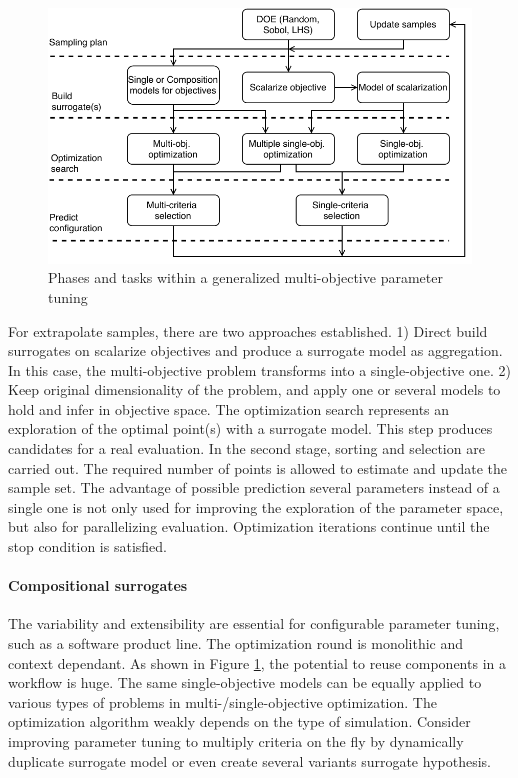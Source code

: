             \begin{figure} 
                \centering
                \includegraphics[width=\textwidth]{content/images/tax_mb_tuning}
                \caption[Phases and tasks within a generalized multi-objective parameter tuning]{Phases and tasks within a generalized multi-objective parameter tuning}
                \label{fig:mo_param_tuning}
            \end{figure}

            For extrapolate samples, there are two approaches established. 1) Direct build surrogates on scalarize objectives and produce a surrogate model as aggregation. In this case, the multi-objective problem transforms into a single-objective one. 2) Keep original dimensionality of the problem, and apply one or several models to hold and infer in objective space.
            The optimization search represents an exploration of the optimal point(s) with a surrogate model. This step produces candidates for a real evaluation. In the second stage, sorting and selection are carried out. The required number of points is allowed to estimate and update the sample set. The advantage of possible prediction several parameters instead of a single one is not only used for improving the exploration of the parameter space, but also for parallelizing evaluation.  Optimization iterations continue until the stop condition is satisfied.
    
    
            \paragraph{Compositional surrogates}
            The variability and extensibility are essential for configurable parameter tuning, such as a software product line. The optimization round is monolithic and context dependant. As shown in Figure \ref{fig:mo_param_tuning}, the potential to reuse components in a workflow is huge. The same single-objective models can be equally applied to various types of problems in multi-/single-objective optimization. The optimization algorithm weakly depends on the type of simulation. 
            Consider improving parameter tuning to multiply criteria on the fly by dynamically duplicate surrogate model or even create several variants surrogate hypothesis.

